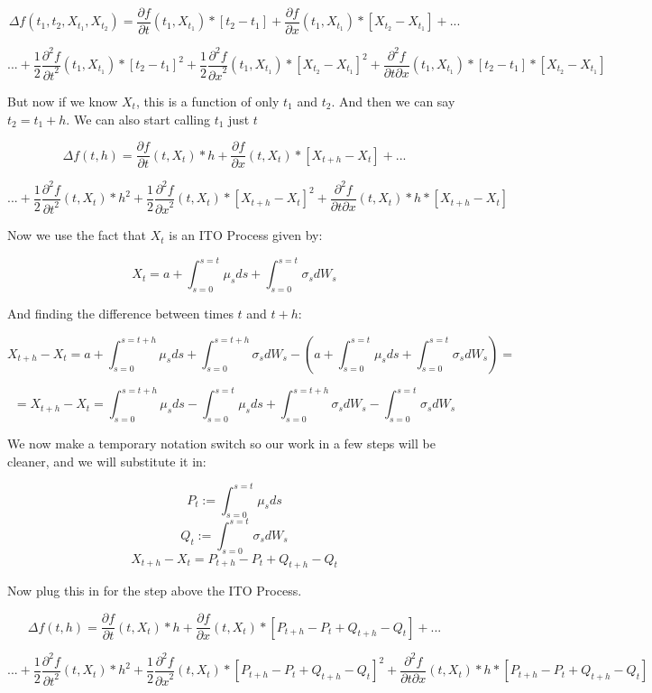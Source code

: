 \documentclass{article}
\begin{document}
$$\Delta f(t_1,t_2,X_{t_1},X_{t_2}) = \frac{\partial f}{\partial t}(t_1,X_{t_1}) *[t_2-t_1] + \frac{\partial f}{\partial x}(t_1,X_{t_1}) *[X_{t_2}-X_{t_1}]  + ... $$

$$... +  \frac{1}{2}\frac{\partial^2 f}{{\partial t}^2}(t_1,X_{t_1}) * {[t_2-t_1]}^2 + \frac{1}{2}\frac{\partial^2 f}{{\partial x}^2}(t_1,X_{t_1}) * {[X_{t_2}-X_{t_1}]}^2 +  \frac{\partial^2 f}{\partial t \partial x}(t_1,X_{t_1}) *[t_2-t_1]*[X_{t_2}-X_{t_1}]$$

But now if we know $X_t$, this is a function of only $t_1$ and $t_2$.  And then we can say $t_2 = t_1 + h$. We can also start calling $t_1$ just $t$

$$\Delta f(t,h) = \frac{\partial f}{\partial t}(t,X_{t}) *h + \frac{\partial f}{\partial x}(t,X_{t}) *[X_{t+h}-X_{t}]  + ... $$

$$... +  \frac{1}{2}\frac{\partial^2 f}{{\partial t}^2}(t,X_{t}) * {h}^2 + \frac{1}{2}\frac{\partial^2 f}{{\partial x}^2}(t,X_{t}) * {[X_{t+h}-X_{t}]}^2 +  \frac{\partial^2 f}{\partial t \partial x}(t,X_{t}) *h*[X_{t+h}-X_{t}]$$

Now we use the fact that $X_t$ is an ITO Process given by:

$$X_t = a + \int_{s=0}^{s=t} \mu_sds + \int_{s=0}^{s=t} \sigma_sdW_s$$

And finding the difference between times $t$ and $t+h$:

$$X_{t+h} - X_t = a + \int_{s=0}^{s=t+h} \mu_sds + \int_{s=0}^{s=t+h} \sigma_sdW_s - \left(a + \int_{s=0}^{s=t} \mu_sds + \int_{s=0}^{s=t} \sigma_sdW_s\right) = $$

$$ =  X_{t+h} - X_t = \int_{s=0}^{s=t+h} \mu_sds - \int_{s=0}^{s=t} \mu_sds+ \int_{s=0}^{s=t+h} \sigma_sdW_s - \int_{s=0}^{s=t} \sigma_sdW_s$$

We now make a temporary notation switch so our work in a few steps will be cleaner, and we will substitute it in:

$$P_t := \int_{s=0}^{s=t} \mu_sds$$
$$Q_t := \int_{s=0}^{s=t} \sigma_sdW_s$$
$$  X_{t+h} - X_t = P_{t+h} -P_t+ Q_{t+h} - Q_t$$

Now plug this in for the step above the ITO Process. 

$$\Delta f(t,h) = \frac{\partial f}{\partial t}(t,X_{t}) *h + \frac{\partial f}{\partial x}(t,X_{t}) *[P_{t+h} -P_t+ Q_{t+h} - Q_t]  + ... $$

$$... +  \frac{1}{2}\frac{\partial^2 f}{{\partial t}^2}(t,X_{t}) * {h}^2 + \frac{1}{2}\frac{\partial^2 f}{{\partial x}^2}(t,X_{t}) * {[P_{t+h} -P_t+ Q_{t+h} - Q_t]}^2 +  \frac{\partial^2 f}{\partial t \partial x}(t,X_{t}) *h*[P_{t+h} -P_t+ Q_{t+h} - Q_t]$$
\end{document}
